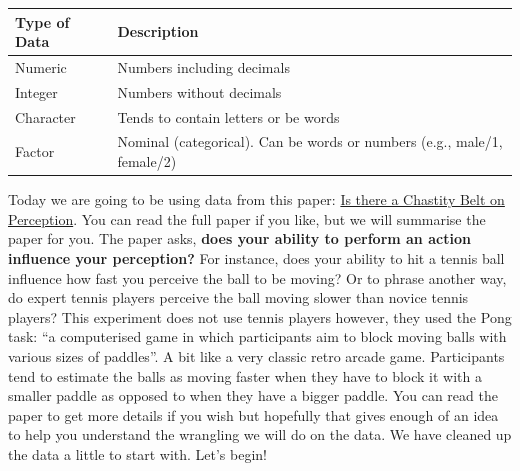 \documentclass[]{book}
\begin{document}
\begin{longtable}[]{@{}ll@{}}
\toprule
\begin{minipage}[b]{0.16\columnwidth}\raggedright
Type of Data\strut
\end{minipage} & \begin{minipage}[b]{0.78\columnwidth}\raggedright
Description\strut
\end{minipage}\tabularnewline
\midrule
\endhead
\begin{minipage}[t]{0.16\columnwidth}\raggedright
Numeric\strut
\end{minipage} & \begin{minipage}[t]{0.78\columnwidth}\raggedright
Numbers including decimals\strut
\end{minipage}\tabularnewline
\begin{minipage}[t]{0.16\columnwidth}\raggedright
Integer\strut
\end{minipage} & \begin{minipage}[t]{0.78\columnwidth}\raggedright
Numbers without decimals\strut
\end{minipage}\tabularnewline
\begin{minipage}[t]{0.16\columnwidth}\raggedright
Character\strut
\end{minipage} & \begin{minipage}[t]{0.78\columnwidth}\raggedright
Tends to contain letters or be words\strut
\end{minipage}\tabularnewline
\begin{minipage}[t]{0.16\columnwidth}\raggedright
Factor\strut
\end{minipage} & \begin{minipage}[t]{0.78\columnwidth}\raggedright
Nominal (categorical). Can be words or numbers (e.g., male/1, female/2)\strut
\end{minipage}\tabularnewline
\bottomrule
\end{longtable}

Today we are going to be using data from this paper: \href{http://journals.sagepub.com/doi/abs/10.1177/0956797617730892}{Is there a Chastity Belt on Perception}. You can read the full paper if you like, but we will summarise the paper for you. The paper asks, \textbf{does your ability to perform an action influence your perception?} For instance, does your ability to hit a tennis ball influence how fast you perceive the ball to be moving? Or to phrase another way, do expert tennis players perceive the ball moving slower than novice tennis players? This experiment does not use tennis players however, they used the Pong task: ``a computerised game in which participants aim to block moving balls with various sizes of paddles''. A bit like a very classic retro arcade game. Participants tend to estimate the balls as moving faster when they have to block it with a smaller paddle as opposed to when they have a bigger paddle. You can read the paper to get more details if you wish but hopefully that gives enough of an idea to help you understand the wrangling we will do on the data. We have cleaned up the data a little to start with. Let's begin!
\end{document}
